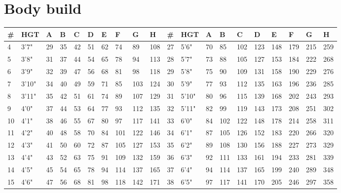 \section{Body build}
\begin{normbox}
\begin{tabularx}{\linewidth}{@{} X X X X X X X X X X | X X X X X X X X X X}
\small
\textbf{\#} & \textbf{HGT} & \textbf{A} & \textbf{B} & \textbf{C} & \textbf{D} & \textbf{E} & \textbf{F} & \textbf{G} & \textbf{H} & \textbf{\#} & \textbf{HGT} & \textbf{A} & \textbf{B} & \textbf{C} & \textbf{D} & \textbf{E} & \textbf{F} & \textbf{G} & \textbf{H}\\
\midrule
4 & 3'7" & 29 & 35 & 42 & 51 & 62 & 74 & 89 & 108 & 27 & 5'6" & 70 & 85 & 102 & 123 & 148 & 179 & 215 & 259\\
5 & 3'8" & 31 & 37 & 44 & 54 & 65 & 78 & 94 & 113 & 28 & 5'7" & 73 & 88 & 105 & 127 & 153 & 184 & 222 & 268\\
6 & 3'9" & 32 & 39 & 47 & 56 & 68 & 81 & 98 & 118 & 29 & 5'8" & 75 & 90 & 109 & 131 & 158 & 190 & 229 & 276\\
7 & 3'10" & 34 & 40 & 49 & 59 & 71 & 85 & 103 & 124 & 30 & 5'9" & 77 & 93 & 112 & 135 & 163 & 196 & 236 & 285\\
8 & 3'11" & 35 & 42 & 51 & 61 & 74 & 89 & 107 & 129 & 31 & 5'10" & 80 & 96 & 115 & 139 & 168 & 202 & 243 & 293\\
9 & 4'0" & 37 & 44 & 53 & 64 & 77 & 93 & 112 & 135 & 32 & 5'11" & 82 & 99 & 119 & 143 & 173 & 208 & 251 & 302\\
10 & 4'1" & 38 & 46 & 55 & 67 & 80 & 97 & 117 & 141 & 33 & 6'0" & 84 & 102 & 122 & 148 & 178 & 214 & 258 & 311\\
11 & 4'2" & 40 & 48 & 58 & 70 & 84 & 101 & 122 & 146 & 34 & 6'1" & 87 & 105 & 126 & 152 & 183 & 220 & 266 & 320\\
12 & 4'3" & 41 & 50 & 60 & 72 & 87 & 105 & 127 & 153 & 35 & 6'2" & 89 & 108 & 130 & 156 & 188 & 227 & 273 & 329\\
13 & 4'4" & 43 & 52 & 63 & 75 & 91 & 109 & 132 & 159 & 36 & 6'3" & 92 & 111 & 133 & 161 & 194 & 233 & 281 & 339\\
14 & 4'5" & 45 & 54 & 65 & 78 & 94 & 114 & 137 & 165 & 37 & 6'4" & 94 & 114 & 137 & 165 & 199 & 240 & 289 & 348\\
15 & 4'6" & 47 & 56 & 68 & 81 & 98 & 118 & 142 & 171 & 38 & 6'5" & 97 & 117 & 141 & 170 & 205 & 246 & 297 & 358\\

\end{tabularx}
\end{normbox}
